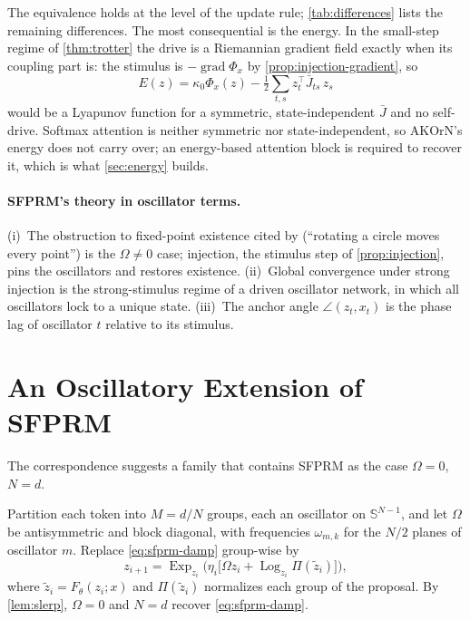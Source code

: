 \documentclass{article}
\theoremstyle{plain}
\theoremstyle{definition}
\theoremstyle{remark}
\newcommand{\Sph}{\mathbb{S}}
\newcommand{\Ret}{\Pi}
\newcommand{\Exp}{\operatorname{Exp}}
\newcommand{\Log}{\operatorname{Log}}
\newcommand{\grad}{\operatorname{grad}}
\begin{document}
The equivalence holds at the level of the update rule; \cref{tab:differences} lists the remaining
differences. The most consequential is the energy. In the small-step regime of \cref{thm:trotter} the
drive is a Riemannian gradient field exactly when its coupling part is: the stimulus is
$-\grad\Phi_x$ by \cref{prop:injection-gradient}, so
\begin{equation}
  E(z) = \kappa_0\Phi_x(z) - \tfrac12\textstyle\sum_{t,s}z_t^\top \bar J_{ts}\, z_s
\end{equation}
would be a Lyapunov function for a symmetric, state-independent $\bar J$ and no self-drive. Softmax
attention is neither symmetric nor state-independent, so AKOrN's energy does not carry over; an
energy-based attention block is required to recover it, which is what \cref{sec:energy} builds.

\paragraph{SFPRM's theory in oscillator terms.} (i)~The obstruction to fixed-point existence cited by
\citet{sfprm} (``rotating a circle moves every point'') is the $\Omega\neq0$ case; injection, the
stimulus step of \cref{prop:injection}, pins the oscillators and restores existence. (ii)~Global
convergence under strong injection is the strong-stimulus regime of a driven oscillator network, in
which all oscillators lock to a unique state. (iii)~The anchor angle $\angle(z_t,x_t)$ is the phase lag
of oscillator $t$ relative to its stimulus.

\section{An Oscillatory Extension of SFPRM}
\label{sec:oscillatory}

The correspondence suggests a family that contains SFPRM as the case $\Omega=0$, $N=d$.

\begin{definition}
\label{def:osc}
Partition each token into $M=d/N$ groups, each an oscillator on $\Sph^{N-1}$, and let $\Omega$ be
antisymmetric and block diagonal, with frequencies $\omega_{m,k}$ for the $N/2$ planes of oscillator
$m$. Replace \eqref{eq:sfprm-damp} group-wise by
\begin{equation}
  z_{i+1} = \Exp_{z_i}\big(\eta_i\big[\Omega z_i + \Log_{z_i}\Ret(\tilde z_i)\big]\big),
  \label{eq:osc-sfprm}
\end{equation}
where $\tilde z_i=F_\theta(z_i;x)$ and $\Ret(\tilde z_i)$ normalizes each group of the proposal. By
\cref{lem:slerp}, $\Omega=0$ and $N=d$ recover \eqref{eq:sfprm-damp}.
\end{definition}
\end{document}
